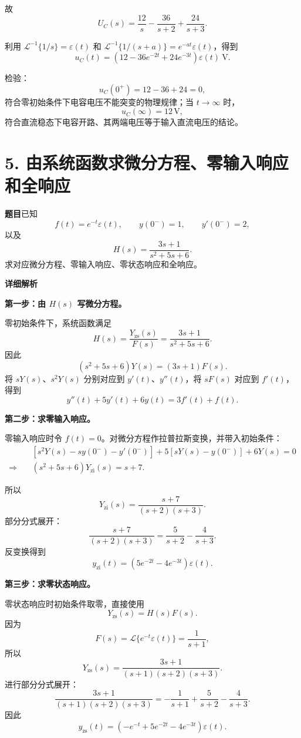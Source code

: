 \documentclass[12pt,a4paper]{ctexart}
\newcommand{\eps}{\varepsilon}
\begin{document}
故
\[
U_C(s)=\frac{12}{s}-\frac{36}{s+2}+\frac{24}{s+3}.
\]

利用 \(\displaystyle \mathcal L^{-1}\{1/s\}=\eps(t)\) 和
\(\displaystyle \mathcal L^{-1}\{1/(s+a)\}=e^{-at}\eps(t)\)，得到
\[
\boxed{
u_C(t)=\left(12-36e^{-2t}+24e^{-3t}\right)\eps(t)\ \mathrm V.}
\]

检验：
\[
u_C(0^+)=12-36+24=0,
\]
符合零初始条件下电容电压不能突变的物理规律；当 $t\to\infty$ 时，
\[
u_C(\infty)=12\,\mathrm V,
\]
符合直流稳态下电容开路、其两端电压等于输入直流电压的结论。

\newpage
\section*{5. 由系统函数求微分方程、零输入响应和全响应}

\textbf{题目}\quad 已知
\[f(t)=e^{-t}\eps(t),\qquad y(0^-)=1,\qquad y'(0^-)=2,\]
以及
\[
H(s)=\frac{3s+1}{s^2+5s+6}.
\]
求对应微分方程、零输入响应、零状态响应和全响应。

\textbf{详细解析}

\textbf{第一步：由 $H(s)$ 写微分方程。}

零初始条件下，系统函数满足
\[
H(s)=\frac{Y_{\mathrm{zs}}(s)}{F(s)}
=\frac{3s+1}{s^2+5s+6}.
\]
因此
\[
(s^2+5s+6)Y(s)=(3s+1)F(s).
\]
将 $sY(s)$、$s^2Y(s)$ 分别对应到 $y'(t)$、$y''(t)$，将 $sF(s)$ 对应到 $f'(t)$，得到
\[
\boxed{y''(t)+5y'(t)+6y(t)=3f'(t)+f(t).}
\]

\textbf{第二步：求零输入响应。}

零输入响应时令 $f(t)=0$。对微分方程作拉普拉斯变换，并带入初始条件：
\begin{align*}
&\left[s^2Y(s)-sy(0^-)-y'(0^-)\right]
+5\left[sY(s)-y(0^-)\right]+6Y(s)=0\\
\Rightarrow\quad
&(s^2+5s+6)Y_{\mathrm{zi}}(s)=s+7.
\end{align*}

所以
\[
Y_{\mathrm{zi}}(s)=\frac{s+7}{(s+2)(s+3)}.
\]
部分分式展开：
\[
\frac{s+7}{(s+2)(s+3)}
=\frac5{s+2}-\frac4{s+3}.
\]
反变换得到
\[
\boxed{
y_{\mathrm{zi}}(t)=\left(5e^{-2t}-4e^{-3t}\right)\eps(t).}
\]

\textbf{第三步：求零状态响应。}

零状态响应时初始条件取零，直接使用
\[
Y_{\mathrm{zs}}(s)=H(s)F(s).
\]
因为
\[
F(s)=\mathcal L\{e^{-t}\eps(t)\}=\frac{1}{s+1},
\]
所以
\[
Y_{\mathrm{zs}}(s)
=\frac{3s+1}{(s+1)(s+2)(s+3)}.
\]
进行部分分式展开：
\[
\frac{3s+1}{(s+1)(s+2)(s+3)}
=-\frac1{s+1}+\frac5{s+2}-\frac4{s+3}.
\]
因此
\[
\boxed{
y_{\mathrm{zs}}(t)=
\left(-e^{-t}+5e^{-2t}-4e^{-3t}\right)\eps(t).}
\]
\end{document}
